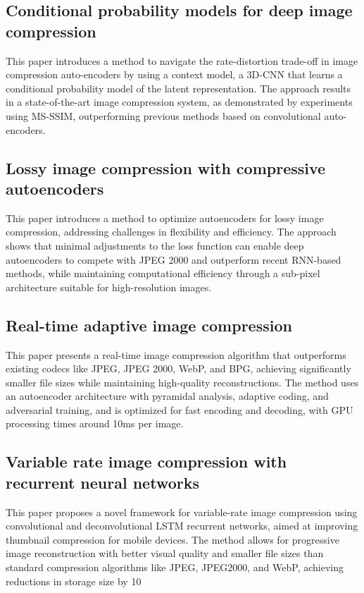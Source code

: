 \documentclass[conference]{IEEEtran}
\begin{document}
\subsection{Conditional probability models for deep image compression \cite{hf06009}} 
This paper introduces a method to navigate the rate-distortion trade-off in image compression auto-encoders by using a context model, a 3D-CNN that learns a conditional probability model of the latent representation. The approach results in a state-of-the-art image compression system, as demonstrated by experiments using MS-SSIM, outperforming previous methods based on convolutional auto-encoders.

\subsection{Lossy image compression with compressive autoencoders \cite{hf06010}} 
This paper introduces a method to optimize autoencoders for lossy image compression, addressing challenges in flexibility and efficiency. The approach shows that minimal adjustments to the loss function can enable deep autoencoders to compete with JPEG 2000 and outperform recent RNN-based methods, while maintaining computational efficiency through a sub-pixel architecture suitable for high-resolution images.

\subsection{Real-time adaptive image compression \cite{hf06011}} 
This paper presents a real-time image compression algorithm that outperforms existing codecs like JPEG, JPEG 2000, WebP, and BPG, achieving significantly smaller file sizes while maintaining high-quality reconstructions. The method uses an autoencoder architecture with pyramidal analysis, adaptive coding, and adversarial training, and is optimized for fast encoding and decoding, with GPU processing times around 10ms per image.

\subsection{Variable rate image compression with recurrent neural networks \cite{hf06012}} 
This paper proposes a novel framework for variable-rate image compression using convolutional and deconvolutional LSTM recurrent networks, aimed at improving thumbnail compression for mobile devices. The method allows for progressive image reconstruction with better visual quality and smaller file sizes than standard compression algorithms like JPEG, JPEG2000, and WebP, achieving reductions in storage size by 10%
\end{document}
